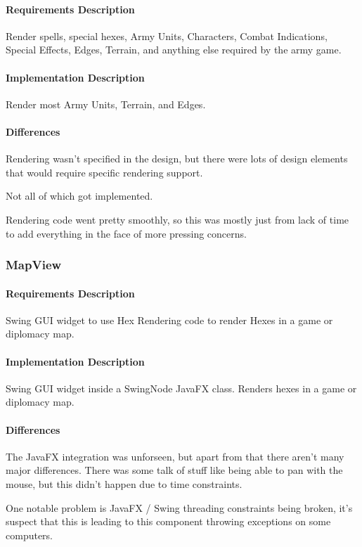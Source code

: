 \documentclass[12pt,a4paper,titlepage]{article}
\begin{document}
\paragraph{Requirements Description}
Render spells, special hexes, Army Units, Characters, 
Combat Indications, Special Effects, Edges, Terrain, and 
anything else required by the army game.
\paragraph{Implementation Description}
Render most Army Units, Terrain, and Edges.

\paragraph{Differences}
Rendering wasn't specified in the design, but there were lots of 
design elements that would require specific rendering support.

Not all of which got implemented.

Rendering code went pretty smoothly, so this was
mostly just from lack of time to add everything in the face of
more pressing concerns.

\subsubsection{MapView}
\paragraph{Requirements Description} 
Swing GUI widget to use Hex Rendering code to render Hexes in a game or diplomacy map.
\paragraph{Implementation Description}
Swing GUI widget inside a SwingNode JavaFX class. Renders hexes in a game or diplomacy map.
\paragraph{Differences}
The JavaFX integration was unforseen, but apart from that there aren't many major differences.
There was some talk of stuff like being able to pan with the mouse, but this didn't happen
due to time constraints.

One notable problem is JavaFX / Swing threading constraints being broken,
it's suspect that this is leading to this component throwing exceptions
on some computers.
\end{document}
